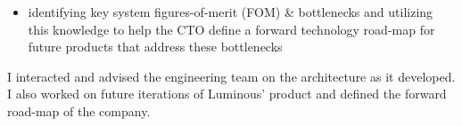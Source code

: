 \documentclass[10pt,a4paper]{article}
\begin{document}
{{{\begin{itemize}
      \item identifying key system figures-of-merit (FOM) \& bottlenecks and utilizing this knowledge to help the CTO define a forward technology road-map for future products that address these bottlenecks
    \end{itemize}
    I interacted and advised the engineering team on the architecture as it developed. I also worked on future iterations of Luminous’ product and defined the forward road-map of the company.






  }}

}
\end{document}

